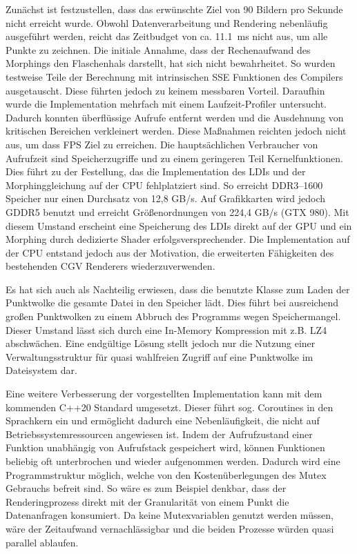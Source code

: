 \documentclass[hyperref, beleg, german]{cgvpub}
\begin{document}
Zunächst ist festzustellen, dass das erwünschte Ziel von 90 Bildern pro Sekunde
nicht erreicht wurde. Obwohl Datenverarbeitung und Rendering nebenläufig
ausgeführt werden, reicht das Zeitbudget von ca. \SI{11,1}{\milli\second} nicht
aus, um alle Punkte zu zeichnen. Die initiale Annahme, dass der Rechenaufwand
des Morphings den Flaschenhals darstellt, hat sich nicht bewahrheitet. So
wurden testweise Teile der Berechnung mit intrinsischen SSE Funktionen des
Compilers ausgetauscht. Diese führten jedoch zu keinem messbaren Vorteil.
Daraufhin wurde die Implementation mehrfach mit einem Laufzeit-Profiler
untersucht. Dadurch konnten überflüssige Aufrufe entfernt werden und die
Ausdehnung von kritischen Bereichen verkleinert werden. Diese Maßnahmen
reichten jedoch nicht aus, um dass FPS Ziel zu erreichen. Die hauptsächlichen
Verbraucher von Aufrufzeit sind Speicherzugriffe und zu einem geringeren Teil
Kernelfunktionen. Dies führt zu der Festellung, das die Implementation des LDIs
und der Morphinggleichung auf der CPU fehlplatziert sind. So erreicht
DDR3--1600 Speicher nur einen Durchsatz von 12,8 GB/s. Auf Grafikkarten wird
jedoch GDDR5 benutzt und erreicht Größenordnungen von 224,4 GB/s (GTX 980). Mit
diesem Umstand erscheint eine Speicherung des LDIs direkt auf der GPU und ein
Morphing durch dedizierte Shader erfolgsversprechender. Die Implementation auf
der CPU entstand jedoch aus der Motivation, die erweiterten Fähigkeiten des
bestehenden CGV Renderers wiederzuverwenden.

Es hat sich auch als Nachteilig erwiesen, dass die benutzte Klasse zum Laden
der Punktwolke die gesamte Datei in den Speicher lädt. Dies führt bei
ausreichend großen Punktwolken zu einem Abbruch des Programms wegen
Speichermangel. Dieser Umstand lässt sich durch eine In-Memory Kompression mit
z.B. LZ4 abschwächen. Eine endgültige Lösung stellt jedoch nur die Nutzung
einer Verwaltungsstruktur für quasi wahlfreien Zugriff auf eine Punktwolke im
Dateisystem dar.

Eine weitere Verbesserung der vorgestellten Implementation kann mit dem
kommenden C++20 Standard umgesetzt. Dieser führt sog. Coroutines in den
Sprachkern ein und ermöglicht dadurch eine Nebenläufigkeit, die nicht auf
Betriebssystemressourcen angewiesen ist. Indem der Aufrufzustand einer Funktion
unabhängig von Aufrufstack gespeichert wird, können Funktionen beliebig oft
unterbrochen und wieder aufgenommen werden. Dadurch wird eine Programmstruktur
möglich, welche von den Kostenüberlegungen des Mutex Gebrauchs befreit sind. So
wäre es zum Beispiel denkbar, dass der Renderingprozess direkt mit der
Granularität von einem Punkt die Datenanfragen konsumiert. Da keine
Mutexvariablen genutzt werden müssen, wäre der Zeitaufwand vernachlässigbar und
die beiden Prozesse würden quasi parallel ablaufen.
\end{document}
